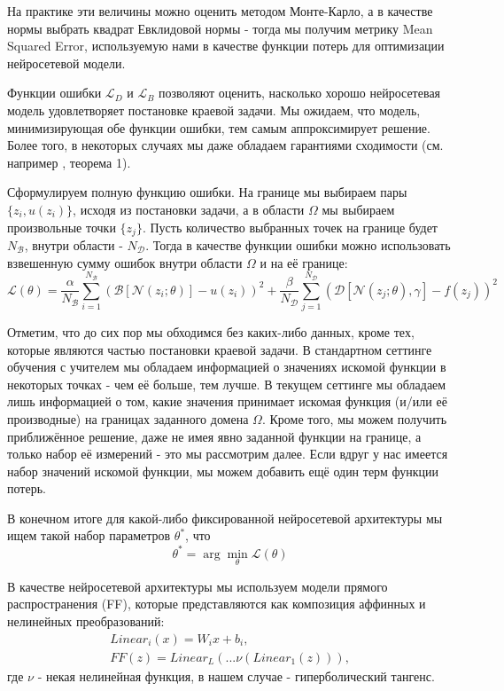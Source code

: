 \documentclass[a4paper, 12pt]{article}
\begin{document}
На практике эти величины можно оценить методом Монте-Карло, а в качестве нормы выбрать квадрат Евклидовой нормы - тогда мы получим метрику Mean Squared Error, используемую нами в качестве функции потерь для оптимизации нейросетевой модели.

Функции ошибки $\mathcal{L}_D$ и $\mathcal{L}_B$ позволяют оценить, насколько хорошо нейросетевая модель удовлетворяет постановке краевой задачи. Мы ожидаем, что модель, минимизирующая обе функции ошибки, тем самым аппроксимирует решение. Более того, в некоторых случаях мы даже обладаем гарантиями сходимости (см. например \cite{vandermeer2021optimally}, теорема 1).

Сформулируем полную функцию ошибки. На границе мы выбираем пары $\{z_i, u(z_i)\}$, исходя из постановки задачи, а в области $\Omega$ мы выбираем произвольные точки $\{z_j\}$. Пусть количество выбранных точек на границе будет $N_\mathcal{B}$, внутри области - $N_\mathcal{D}$. Тогда в качестве функции ошибки можно использовать взвешенную сумму ошибок внутри области $\Omega$ и на её границе:
\begin{equation} \label{eq:pinn:empiricalLoss}
\mathcal{L}(\theta) = \frac{\alpha}{N_\mathcal{B}} \sum_{i = 1}^{N_\mathcal{B}} (\mathcal{B}[\mathcal{N}(z_i; \theta)] - u(z_i))^2 + \frac{\beta}{N_\mathcal{D}} \sum_{j = 1}^{N_\mathcal{D}} (\mathcal{D}[\mathcal{N}(z_j; \theta), \gamma] - f(z_j))^2
\end{equation}

Отметим, что до сих пор мы обходимся без каких-либо данных, кроме тех, которые являются частью постановки краевой задачи. В стандартном сеттинге обучения с учителем мы обладаем информацией о значениях искомой функции в некоторых точках - чем её больше, тем лучше. В текущем сеттинге мы обладаем лишь информацией о том, какие значения принимает искомая функция (и/или её производные) на границах заданного домена $\Omega$. Кроме того, мы можем получить приближённое решение, даже не имея явно заданной функции на границе, а только набор её измерений - это мы рассмотрим далее. Если вдруг у нас имеется набор значений искомой функции, мы можем добавить ещё один терм функции потерь.

В конечном итоге для какой-либо фиксированной нейросетевой архитектуры мы ищем такой набор параметров $\theta^*$, что
$$
\theta^* = \arg \min_{\theta} \mathcal{L}(\theta)
$$

В качестве нейросетевой архитектуры мы используем модели прямого распространения (FF), которые представляются как композиция аффинных и нелинейных преобразований:
\begin{equation} \label{eq:pinn:networkArchitecture}
    \begin{gathered}
        Linear_i(x) = W_ix + b_i,\\
        FF(z) = Linear_L(...\nu(Linear_1(z))),
    \end{gathered}
\end{equation}
где $\nu$ - некая нелинейная функция, в нашем случае - гиперболический тангенс.
\end{document}
